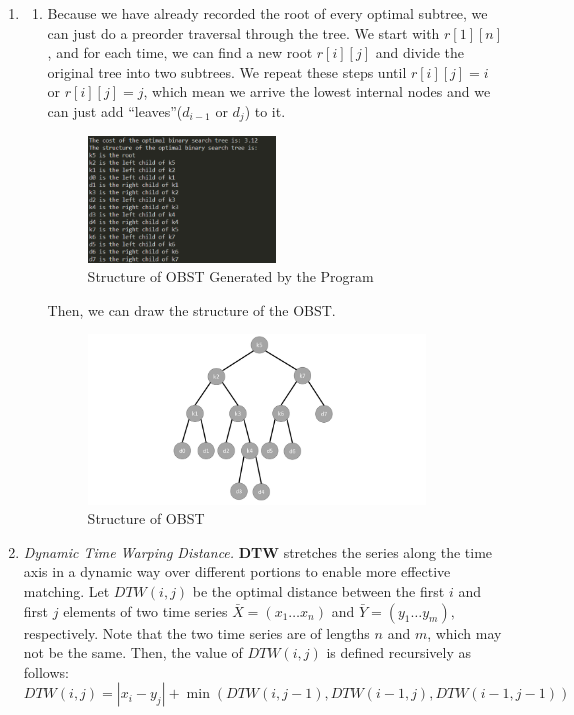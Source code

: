 \documentclass[12pt,a4paper]{article}
\makeatletter
\newtheorem*{solution}{Solution}
\theoremstyle{definition}
\renewenvironment{solution}[1][Solution] {\par\pushQED{\qed}\normalfont\topsep6\p@\@plus6\p@\relax\trivlist\item[\hskip\labelsep\bfseries#1\@addpunct{.}]\ignorespaces}{\popQED\endtrivlist\@endpefalse} \makeatother
\makeatother
\begin{document}
\begin{enumerate}
\begin{solution}
\begin{enumerate}
            \item
            Because we have already recorded the root of  every optimal subtree, we can just do a preorder traversal through the tree. We start with $r[1][n]$, and for each time, we can find a new root $r[i][j]$ and divide the original tree into two subtrees. We repeat these steps until $r[i][j] = i$ or $r[i][j] = j$, which mean we arrive the lowest internal nodes and we can just add ``leaves''($d_{i-1}$ or $d_{j}$) to it.
            \begin{figure}[htbp]
                \centering \includegraphics[width=0.5\textwidth]{Fig-TreeResult.png}
                \caption{Structure of OBST Generated by the Program}\label{Fig-TreeResult}
            \end{figure}
    		Then, we can draw the structure of the OBST.
    		\begin{figure}[htbp]
                \centering \includegraphics[width=0.9\textwidth]{Fig-OBST.pdf}
                \caption{Structure of OBST}\label{Fig-OBST}
            \end{figure}
    		\end{enumerate}
		\end{solution}
		
		\item \textit{Dynamic Time Warping Distance.} \textbf{DTW} stretches the series along the time axis in a dynamic way over different
		portions to enable more effective matching. Let $D T W(i, j)$ be the optimal distance between the first $i$ and first $j$ elements of two time series $\bar{X}=\left(x_{1} \ldots x_{n}\right)$ and $\bar{Y}=\left(y_{1} \ldots y_{m}\right),$ respectively. Note that the two time series are of lengths $n$ and $m$, which may not be the same. Then, the value of $D T W(i, j)$ is defined recursively as follows:
		$$
		DTW(i, j)=\left|x_{i}- y_{j}\right|+\min(DTW(i, j-1), DTW(i-1, j), DTW(i-1, j-1))
		$$
		

\end{enumerate}
\end{document}
